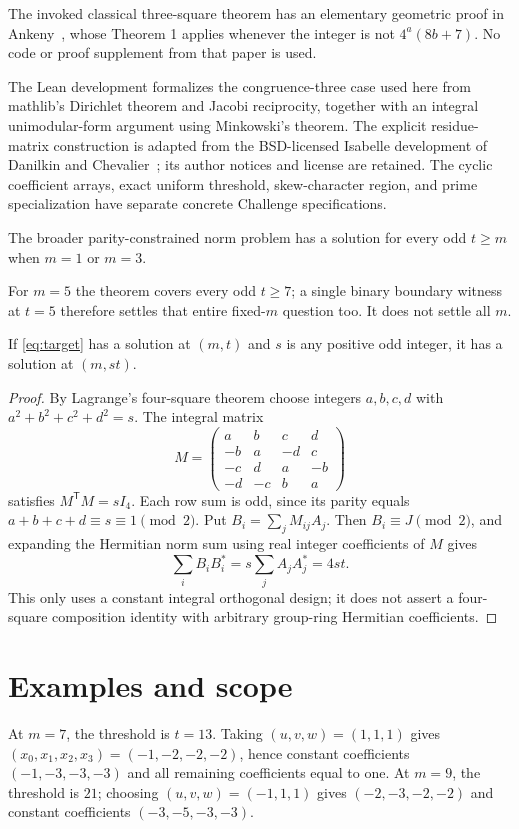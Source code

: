 The invoked classical three-square theorem has an elementary geometric
proof in Ankeny~\cite{Ankeny}, whose Theorem 1 applies whenever the
integer is not $4^a(8b+7)$. No code or proof supplement from that paper
is used.

The Lean development formalizes the congruence-three case used here from
mathlib's Dirichlet theorem and Jacobi reciprocity, together with an integral
unimodular-form argument using Minkowski's theorem. The explicit residue-matrix
construction is adapted from the BSD-licensed Isabelle development of Danilkin
and Chevalier~\cite{AFPThreeSquares}; its author notices and license are retained.
The cyclic coefficient arrays, exact uniform threshold, skew-character region,
and prime specialization have separate concrete Challenge specifications.


\begin{corollary}
The broader parity-constrained norm problem has a solution for every
odd $t\ge m$ when $m=1$ or $m=3$.
\end{corollary}
For $m=5$ the theorem covers every odd $t\ge7$; a single binary boundary
witness at $t=5$ therefore settles that entire fixed-$m$ question too.
It does not settle all $m$.

\begin{proposition}\label{prop:multiplier}
If \eqref{eq:target} has a solution at $(m,t)$ and $s$ is any positive
odd integer, it has a solution at $(m,st)$.
\end{proposition}
\begin{proof}
By Lagrange's four-square theorem choose integers $a,b,c,d$ with
$a^2+b^2+c^2+d^2=s$. The integral matrix
\[
 M=\begin{pmatrix}
 a&b&c&d\\-b&a&-d&c\\-c&d&a&-b\\-d&-c&b&a
 \end{pmatrix}
\]
satisfies $M^{\mathsf T}M=sI_4$. Each row sum is odd, since its parity
equals $a+b+c+d\equiv s\equiv1\pmod2$.
Put $B_i=\sum_jM_{ij}A_j$. Then $B_i\equiv J\pmod2$, and expanding
the Hermitian norm sum using real integer coefficients of $M$ gives
\[
 \sum_i B_iB_i^*=s\sum_jA_jA_j^*=4st.
\]
This only uses a constant integral orthogonal design; it does not
assert a four-square composition identity with arbitrary group-ring
Hermitian coefficients.
\end{proof}

\section*{Examples and scope}
At $m=7$, the threshold is $t=13$. Taking $(u,v,w)=(1,1,1)$ gives
$(x_0,x_1,x_2,x_3)=(-1,-2,-2,-2)$, hence constant coefficients
$(-1,-3,-3,-3)$ and all remaining coefficients equal to one.
At $m=9$, the threshold is $21$; choosing $(u,v,w)=(-1,1,1)$ gives
$(-2,-3,-2,-2)$ and constant coefficients $(-3,-5,-3,-3)$.

